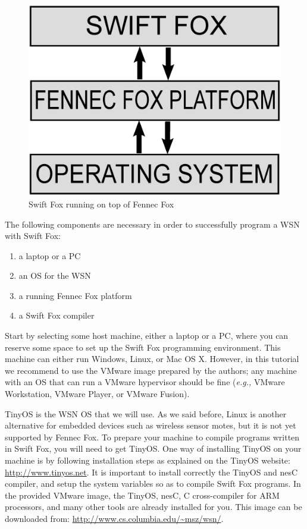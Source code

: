 \documentclass[11pt]{article}
\begin{document}
\begin{figure}[htp]
\centering
	\includegraphics[scale=0.3]{fig/sflayers.eps}
	\caption{Swift Fox running on top of Fennec Fox}
	\label{fig:sflayers}
\end{figure}

The following components are necessary in order to successfully program a
WSN with Swift Fox:

\begin{enumerate}
	\item a laptop or a PC
	\item an OS for the WSN
	\item a running Fennec Fox platform
	\item a Swift Fox compiler
\end{enumerate}

Start by selecting some host machine, either a laptop or a PC, where you
can reserve some space to set up the Swift Fox programming environment.
This machine can either run Windows, Linux, or Mac OS X. However, in this
tutorial we recommend to use the VMware image prepared by the authors; any
machine with an OS that can run a VMware hypervisor should be fine
(\textit{e.g.,} VMware Workstation, VMware Player, or VMware Fusion).

TinyOS is the WSN OS that we will use. As we said before, Linux is another 
alternative for embedded devices such as wireless sensor motes, but it is
not yet supported by Fennec Fox. To prepare your machine to compile
programs written in Swift Fox, you will need to get TinyOS. One way of
installing TinyOS on your machine is by following installation steps as
explained on the TinyOS website: \url{http://www.tinyos.net}. It is
important to install correctly the TinyOS and nesC compiler, and setup the
system variables so as to compile Swift Fox programs. In the provided
VMware image, the TinyOS, nesC, C cross-compiler for ARM processors, 
and many other tools are already installed for you. This image can be
downloaded from: \url{http://www.cs.columbia.edu/~msz/wsn/}.
\end{document}
